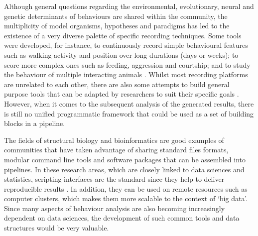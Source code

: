 \documentclass[10pt,letterpaper]{article}\usepackage[]{graphicx}\usepackage[]{color}
\begin{document}

%

Although general questions regarding the environmental, evolutionary, neural and genetic determinants of behaviours are shared within the community,
the multiplicity of model organisms, hypotheses and paradigms has led to the existence of a very diverse palette of specific recording techniques.
Some tools were developed, for instance,
to continuously record simple behavioural features such as walking activity\cite{faville_how_2015} and  position\cite{pelkowski_novel_2011} over long durations (days or weeks);
to score more complex ones such as feeding\cite{itskov_automated_2014,ro_flic_2014}, aggression\cite{dankert_automated_2009} and courtship\cite{tsai_image_2012};
and to study the behaviour of multiple interacting animals \cite{swierczek_high-throughput_2011,perez-escudero_idtracker_2014,robie_mapping_2017}.
Whilst most recording platforms are unrelated to each other, there are also some attempts to build general purpose tools that can be adapted by researchers to
suit their specific goals \cite{branson_high-throughput_2009,kabra_jaaba_2013,lopes_bonsai_2015,geissmann_ethoscopes_2017}.
However, when it comes to the subsequent analysis of the generated results, there is still no unified programmatic framework that could be used as a set of building blocks in a pipeline.


The fields of structural biology and  bioinformatics are good examples of communities that have taken advantage of sharing standard files formats, modular command line tools\cite{roumpeka_review_2017} and software packages\cite{huber_orchestrating_2015} that can be assembled into pipelines\cite{leipzig_review_2017}.
In these research areas, which are closely linked to data sciences and statistics, scripting interfaces are the standard since they help to deliver reproducible results \cite{peng_reproducible_2011,stodden_toward_2013}.
In addition, they can be used on remote resources such as computer clusters, which makes them more scalable to the context of `big data'\cite{hashem_rise_2015}.
Since many aspects of behaviour analysis are also becoming increasingly dependent on data sciences, the development of such common tools and data structures would be very valuable.
\end{document}
